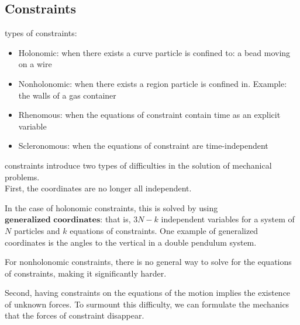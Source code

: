 \documentclass[]{article}
\numberwithin{equation}{section}
\begin{document}
\subsection{Constraints}
types of constraints:
\begin{itemize}
	\item Holonomic: when there exists a curve particle is confined to: a bead moving on a wire
	\item Nonholonomic: when there exists a region particle is confined in. Example: the walls of a gas container
	\item Rhenomous: when the equations of constraint contain time as an explicit variable
	\item Scleronomous: when the equations of constraint are time-independent
\end{itemize}
constraints introduce two types of difficulties in the solution of mechanical problems.\\

First, the coordinates are no longer all independent. 

In the case of holonomic constraints, this is solved by using $\textbf{generalized coordinates}$: that is, $3N-k$ independent variables for a system of $N$ particles and $k$ equations of constraints. One example of generalized coordinates is the angles to the vertical in a double pendulum system. 

For nonholonomic constraints, there is no general way to solve for the equations of constraints, making it significantly harder. 

Second, having constraints on the equations of the motion implies the existence of unknown forces. To surmount this difficulty, we can formulate the mechanics that the forces of constraint disappear. 
\end{document}

